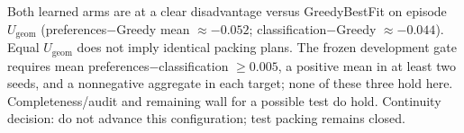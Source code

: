 Both learned arms are at a clear disadvantage versus GreedyBestFit on episode
$U_{\mathrm{geom}}$ (preferences$-$Greedy mean $\approx -0.052$;
classification$-$Greedy $\approx -0.044$). Equal $U_{\mathrm{geom}}$ does not
imply identical packing plans. The frozen development gate requires mean
preferences$-$\allowbreak classification $\ge 0.005$, a positive mean in at
least two seeds, and a nonnegative aggregate in each target; none of these
three hold here.
Completeness/audit and remaining wall for a possible test do hold. Continuity
decision: do not advance this configuration; test packing remains closed.
